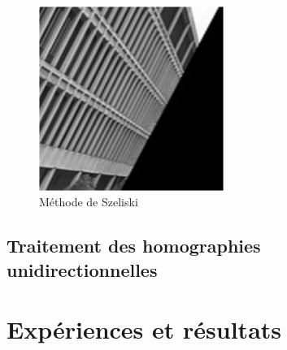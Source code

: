 \documentclass[c,12pt]{beamer}
\begin{document}
\begin{frame}
\begin{figure}
\centering
\includegraphics[width=6cm]{zoom_shear_pas_aliase.png}
\caption{Méthode de Szeliski}
\end{figure}
\end{frame}


 \subsection{Traitement des homographies unidirectionnelles}
     
     
     
    
     
     
     
     
     
     
     
     
     
     
\section{Expériences et résultats}
     
     
     
    
     
     
     
     
     
     
     
     
     
\end{document}
